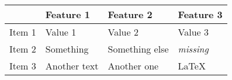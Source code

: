 
\vspace{1cm}
\begin{tabular}{|p{}||p{}|p{}|p{}|}

\hline

 & \textbf{Feature 1} & \textbf{Feature 2} & \textbf{Feature 3}
\\
\hline

Item 1 & Value 1 & Value 2 & Value 3
\\
\hline

Item 2  & Something & Something else & \textit{missing}
\\
\hline

Item 3 & Another text & Another one & \LaTeX\
\\
\hline
\end{tabular}


